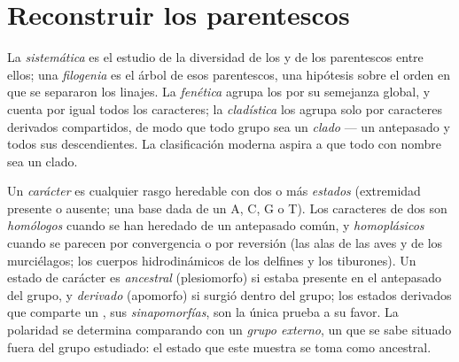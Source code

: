 \section{Reconstruir los parentescos}

\begin{definition}\label{def:b1:classifying-biodiversity:systematics}
La \emph{sistemática} es el estudio de la diversidad de los  y de
los parentescos entre ellos; una \emph{filogenia} es el árbol de esos
parentescos, una hipótesis sobre el orden en que se separaron los linajes.
La \emph{fenética} agrupa los  por su semejanza global, y cuenta
por igual todos los caracteres; la \emph{cladística} los agrupa solo por
caracteres derivados compartidos, de modo que todo grupo sea un \emph{clado}
--- un antepasado y todos sus descendientes. La clasificación moderna aspira
a que todo  con nombre sea un clado.
\end{definition}

\begin{definition}\label{def:b1:classifying-biodiversity:characters}
Un \emph{carácter} es cualquier rasgo heredable con dos o más
\emph{estados} (extremidad presente o ausente; una base dada de un  A, C,
G o T). Los caracteres de dos  son \emph{homólogos} cuando se han
heredado de un antepasado común, y \emph{homoplásicos} cuando se parecen por
convergencia o por reversión (las alas de las aves y de los murciélagos; los
cuerpos hidrodinámicos de los delfines y los tiburones). Un estado de
carácter es \emph{ancestral} (plesiomorfo) si estaba presente en el
antepasado del grupo, y \emph{derivado} (apomorfo) si surgió dentro del
grupo; los estados derivados que comparte un , sus
\emph{sinapomorfías}, son la única prueba a su favor. La polaridad se
determina comparando con un \emph{grupo externo}, un  que se sabe
situado fuera del grupo estudiado: el estado que este muestra se toma como
ancestral.
\end{definition}


